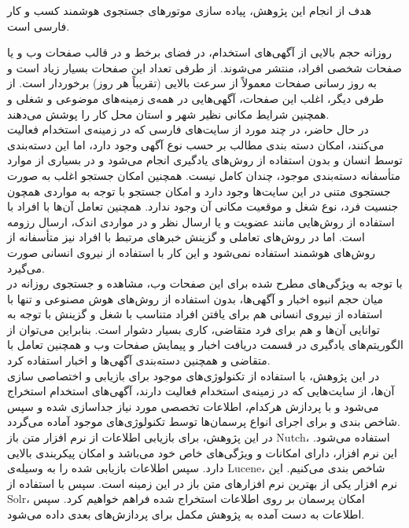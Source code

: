 
هدف از انجام این پژوهش، پیاده سازی موتورهای جستجوی هوشمند کسب و کار فارسی است.

روزانه حجم بالایی از آگهی‌های استخدام، در فضای برخط و در قالب صفحات وب و یا صفحات شخصی افراد، منتشر می‌شوند. از طرفی تعداد این صفحات بسیار زیاد است و به روز رسانی صفحات معمولاً از سرعت بالایی (تقریباً هر روز) برخوردار است. از طرفی دیگر، اغلب این صفحات، آگهی‌هایی در همه‌ی زمینه‌های موضوعی و شغلی و همچنین شرایط مکانی نظیر شهر و استان محل کار را پوشش می‌دهند.
\\
در حال حاضر، در چند مورد از سایت‌های فارسی که در زمینه‌ی استخدام فعالیت می‌کنند، امکان دسته بندی مطالب بر حسب نوع آگهی وجود دارد، اما این دسته‌بندی توسط انسان و بدون استفاده از روش‌های یادگیری انجام می‌شود و در بسیاری از موارد متأسفانه دسته‌بندی موجود، چندان کامل نیست. همچنین امکان جستجو اغلب به صورت جستجوی متنی در این سایت‌ها وجود دارد و امکان جستجو با توجه به مواردی همچون جنسیت فرد، نوع شغل و موقعیت مکانی آن وجود ندارد. همچنین تعامل آن‌ها با افراد با استفاده از روش‌هایی مانند عضویت و یا ارسال نظر و در مواردی اندک، ارسال رزومه است. اما در روش‌های تعاملی و گزینش خبرهای مرتبط با افراد نیز متأسفانه از روش‌های هوشمند استفاده نمی‌شود و این کار با استفاده از نیروی انسانی صورت می‌گیرد.
\\
با توجه به ویژگی‌های مطرح شده برای این صفحات وب، مشاهده و جستجوی روزانه در میان حجم انبوه اخبار و آگهی‌ها، بدون استفاده از روش‌های هوش مصنوعی و تنها با استفاده از نیروی انسانی هم برای یافتن افراد متناسب با شغل و گزینش با توجه به توانایی آن‌ها و هم برای فرد متقاضی، کاری بسیار دشوار است. بنابراین می‌توان از الگوریتم‌های یادگیری در قسمت دریافت اخبار و پیمایش صفحات وب و همچنین تعامل با متقاضی و همچنین دسته‌بندی آگهی‌ها و اخبار استفاده کرد.
\\
در این پژوهش، با استفاده از تکنولوژی‌های موجود برای بازیابی و اختصاصی سازی آن‌ها، از سایت‌هایی که در زمینه‌ی استخدام فعالیت دارند، آگهی‌های استخدام استخراج می‌شود و با پردازش هرکدام، اطلاعات تخصصی مورد نیاز جداسازی شده و سپس شاخص بندی و برای اجرای انواع پرسمان‌ها توسط تکنولوژی‌های موجود آماده می‌گردد.
\\
در این پژوهش، برای بازیابی اطلاعات از نرم افزار متن باز Nutch، استفاده می‌شود. این نرم افزار، دارای امکانات و ویژگی‌های خاص خود می‌باشد و امکان پیکربندی بالایی دارد. سپس اطلاعات بازیابی شده را به وسیله‌ی Lucene، شاخص بندی می‌کنیم. این نرم افزار یکی از بهترین نرم افزارهای متن باز در این زمینه است. سپس با استفاده از Solr، امکان پرسمان بر روی اطلاعات استخراج شده فراهم خواهیم کرد. سپس اطلاعات به دست آمده به پژوهش مکمل برای پردازش‌های بعدی داده می‌شود.
